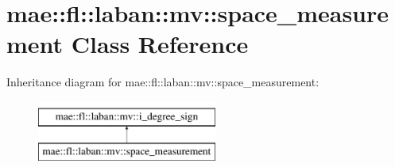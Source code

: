 \hypertarget{classmae_1_1fl_1_1laban_1_1mv_1_1space__measurement}{\section{mae\-:\-:fl\-:\-:laban\-:\-:mv\-:\-:space\-\_\-measurement Class Reference}
\label{classmae_1_1fl_1_1laban_1_1mv_1_1space__measurement}
}
Inheritance diagram for mae\-:\-:fl\-:\-:laban\-:\-:mv\-:\-:space\-\_\-measurement\-:\begin{figure}[H]
\begin{center}
\leavevmode
\includegraphics[height=2.000000cm]{classmae_1_1fl_1_1laban_1_1mv_1_1space__measurement}
\end{center}
\end{figure}
